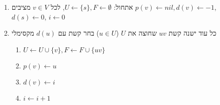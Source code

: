 \begin{enumerate}
\item
אתחול:
$U \leftarrow \{s\}, F \leftarrow \emptyset$, 
לכל 
$v \in V$
מציבים
$p(v) \leftarrow nil, d(v) \leftarrow -1$,
$d(s) \leftarrow 0$,
$i \leftarrow 0$
\item 
כל עוד ישנה קשת 
$uv$
שחוצה את $U$ 
($u \in U$)
בחר קשת עם 
$d(u)$
מקסימלי
	\begin{enumerate}
	\item
	$U \leftarrow U \cup \{v\}, F \leftarrow F \cup \{uv\}$
	\item
	$p(v) \leftarrow u$
	\item
	$d(v) \leftarrow i$
	\item
	$i \leftarrow i + 1$
	\end{enumerate}
\end{enumerate}

